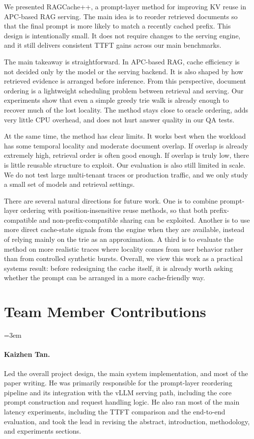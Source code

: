 \documentclass{article}
\begin{document}
We presented RAGCache++, a prompt-layer method for improving KV reuse in APC-based RAG serving. The main idea is to reorder retrieved documents so that the final prompt is more likely to match a recently cached prefix. This design is intentionally small. It does not require changes to the serving engine, and it still delivers consistent TTFT gains across our main benchmarks.

The main takeaway is straightforward. In APC-based RAG, cache efficiency is not decided only by the model or the serving backend. It is also shaped by how retrieved evidence is arranged before inference. From this perspective, document ordering is a lightweight scheduling problem between retrieval and serving. Our experiments show that even a simple greedy trie walk is already enough to recover much of the lost locality. The method stays close to oracle ordering, adds very little CPU overhead, and does not hurt answer quality in our QA tests.

At the same time, the method has clear limits. It works best when the workload has some temporal locality and moderate document overlap. If overlap is already extremely high, retrieval order is often good enough. If overlap is truly low, there is little reusable structure to exploit. Our evaluation is also still limited in scale. We do not test large multi-tenant traces or production traffic, and we only study a small set of models and retrieval settings.

There are several natural directions for future work. One is to combine prompt-layer ordering with position-insensitive reuse methods, so that both prefix-compatible and non-prefix-compatible sharing can be exploited. Another is to use more direct cache-state signals from the engine when they are available, instead of relying mainly on the trie as an approximation. A third is to evaluate the method on more realistic traces where locality comes from user behavior rather than from controlled synthetic bursts. Overall, we view this work as a practical systems result: before redesigning the cache itself, it is already worth asking whether the prompt can be arranged in a more cache-friendly way.

\section{Team Member Contributions}
\label{sec:contrib}

\begingroup
\sloppy
\emergencystretch=3em

\paragraph{Kaizhen Tan.}
Led the overall project design, the main system implementation, and most of the paper writing. He was primarily responsible for the prompt-layer reordering pipeline and its integration with the vLLM serving path, including the core prompt construction and request handling logic. He also ran most of the main latency experiments, including the TTFT comparison and the end-to-end evaluation, and took the lead in revising the abstract, introduction, methodology, and experiments sections.
\end{document}
